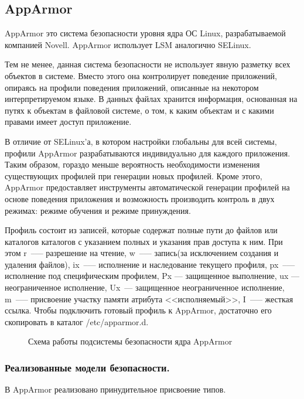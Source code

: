 \subsection{AppArmor}

AppArmor это система безопасности уровня 
ядра ОС Linux, разрабатываемой компанией Novell. 
AppArmor использует LSM аналогично SELinux. 

Тем не менее, данная система безопасности не использует
явную разметку всех объектов в системе.
Вместо этого она контролирует поведение 
приложений, опираясь на профили поведения
приложений, описанные на некотором интерпретируемом
языке. 
В данных файлах хранится информация, основанная на 
путях к объектам в файловой системе, о том, к каким 
объектам и с какими правами имеет доступ приложение. 

В отличие от SELinux'а, 
в котором настройки глобальны для всей системы, профили 
AppArmor разрабатываются индивидуально для каждого 
приложения.
Таким образом, гораздо меньше вероятность 
необходимости изменения существующих профилей при 
генерации новых профилей. Кроме этого, 
AppArmor предоставляет инструменты 
автоматической генерации профилей на основе поведения 
приложения и возможность производить контроль в двух 
режимах: режиме обучения и режиме принуждения. 

Профиль состоит из записей, которые содержат 
полные пути до файлов или каталогов 
каталогов с указанием полных и указания прав
доступа к ним. При этом r~--— 
разрешение на чтение, w~--— запись(за исключением создания 
и удаления файлов), ix~--— исполнение и наследование текущего 
профиля, px~--— исполнение под специфическим профилем, Px — 
защищенное выполнение, ux — неограниченное исполнение, 
Ux~--- защищенное неограниченное исполнение, m~--— присвоение 
участку памяти атрибута <<исполняемый>>, I~--— жесткая ссылка. 
Чтобы подключить готовый профиль к AppArmor, достаточно его 
скопировать в каталог /etc/apparmor.d. 

\begin{figure}
\centering
\subfloat{\label{fig:apparmor}{}}
\caption{Схема работы подсистемы безопасности ядра AppArmor}
\end{figure}

\subsubsection{Реализованные модели безопасности.} 

В AppArmor реализовано принудительное присвоение типов. 

